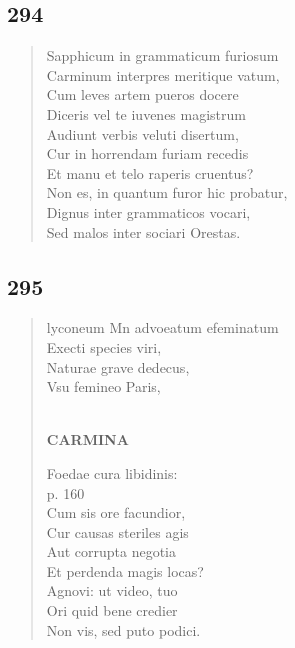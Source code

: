\documentclass[11pt, a4paper]{report}
\begin{document}
            \subsection*{294}
      \begin{verse}
      Sapphicum in grammaticum furiosum \\ Carminum interpres meritique vatum, \\ Cum leves artem pueros docere \\ Diceris vel te iuvenes magistrum \\ Audiunt verbis veluti disertum, \\ Cur in horrendam furiam recedis \\ Et manu et telo raperis cruentus? \\ Non es, in quantum furor hic probatur, \\ Dignus inter grammaticos vocari, \\ Sed malos inter sociari Orestas. \\ 
      \end{verse}
  
            \subsection*{295}
      \begin{verse}
      lyconeum Mn advoeatum efeminatum \\ Execti species viri, \\ Naturae grave dedecus, \\ Vsu femineo Paris, \\ 
        ﻿\pagebreak 
    \begin{center} \textbf{CARMINA} \end{center} \marginpar{[252]} Foedae cura libidinis: \\ p. 160 \\ Cum sis ore facundior, \\ Cur causas steriles agis \\ Aut corrupta negotia \\ Et perdenda magis locas? \\ Agnovi: ut video, tuo \\ Ori quid bene credier \\ Non vis, sed puto podici. \\ 
      \end{verse}
  
\end{document}
